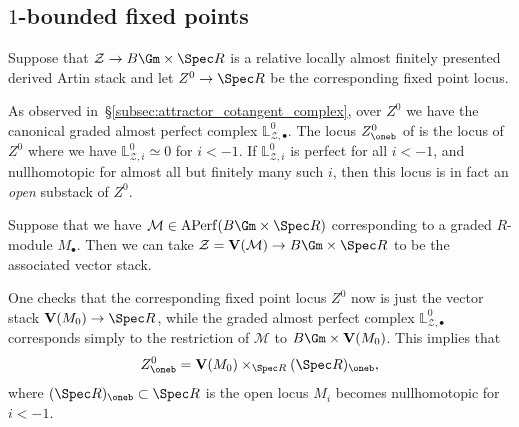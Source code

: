 \documentclass[10pt]{amsart}
\begin{document}
\subsection{$1$-bounded fixed points}
\label{subsec:1-bounded_fixed_points}

Suppose that $\mathcal{Z}\to B\Gm\times\Spec R$ is a relative locally almost finitely presented derived Artin stack and let $Z^0\to \Spec R$ be the corresponding fixed point locus. 

\begin{definition}
As observed in~\S\ref{subsec:attractor_cotangent_complex}, over $Z^0$ we have the canonical graded almost perfect complex $\mathbb{L}^0_{\mathcal{Z},\bullet}$. The locus $Z^0_{\oneb}$ of  is the locus of $Z^0$ where we have $\mathbb{L}^0_{\mathcal{Z},i}\simeq 0$ for $i<-1$. If $\mathbb{L}^0_{\mathcal{Z},i}$ is perfect for all $i<-1$, and nullhomotopic for almost all but finitely many such $i$, then this locus is in fact an \emph{open} substack of $Z^0$.
\end{definition}



\begin{example}
\label{ex:sections_1_bounded_perfect_complexes}
Suppose that we have $\mathcal{M}\in \mathrm{APerf}(B\Gm\times \Spec R)$ corresponding to a graded $R$-module $M_\bullet$. Then we can take $\mathcal{Z} = \mathbf{V}(\mathcal{M})\to B\Gm\times \Spec R$ to be the associated vector stack. 

One checks that the corresponding fixed point locus $Z^0$ now is just the vector stack $\mathbf{V}(M_0)\to \Spec R$, while the graded almost perfect complex $\mathbb{L}^0_{\mathcal{Z},\bullet}$ corresponds simply to the restriction of $\mathcal{M}$ to $B\Gm\times \mathbf{V}(M_0)$. This implies that
\[
Z^0_{\oneb} = \mathbf{V}(M_0)\times_{\Spec R}(\Spec R)_{\oneb},
\]
where $(\Spec R)_{\oneb}\subset \Spec R$ is the open locus $M_i$ becomes nullhomotopic for $i<-1$. 
\end{example}  
\end{document}
